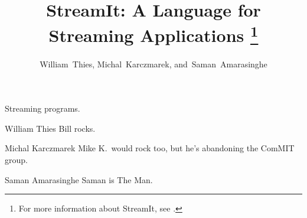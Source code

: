 \documentclass[10pt,twocolumn,twoside]{IEEEtran}
\begin{document}
\pagestyle{headings}

\title{StreamIt: A Language for Streaming Applications%
\thanks{For more information about StreamIt, see \streamiturl.}}

\author{William~Thies, Michal~Karczmarek, and~Saman~Amarasinghe}


\maketitle

\begin{abstract}

\end{abstract}

\begin{keywords}
Streaming programs.
\end{keywords}




%







%

\begin{biography}{William Thies}
Bill rocks.
\end{biography}

\begin{biography}{Michal Karczmarek}
Mike K.~would rock too, but he's abandoning the ComMIT group.
\end{biography}

\begin{biography}%
{Saman Amarasinghe}
Saman is The Man.
\end{biography}
\end{document}
